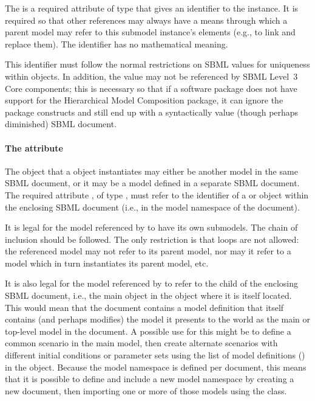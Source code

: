The  is a required attribute of type  that gives
an identifier to the \Submodel instance.  It is required so that other
references may always have a means through which a parent model may
refer to this submodel instance's elements (e.g., to link and replace
them).  The identifier has no mathematical meaning.

This identifier must follow the normal restrictions on SBML
 values for uniqueness within \Model objects.  In
addition, the  value may not be referenced by SBML Level~3
Core components; this is necessary so that if a software package does
not have support for the Hierarchical Model Composition package, it can
ignore the package constructs and still end up with a syntactically
value (though perhaps diminished) SBML document.  


\paragraph{The \hspace*{1pt} attribute}
\label{submodel-modelref}
  
The \Model object that a \Submodel object instantiates may either be
another model in the same SBML document, or it may be a model defined in
a separate SBML document.  The required attribute , of
type , must refer to the identifier of a \Model or
\ExternalModelDefinition object within the enclosing SBML document
(i.e., in the model namespace of the document).  

It is legal for the model referenced by  to have its own submodels.
The chain of inclusion should be followed.  The only restriction is that
loops are not allowed: the referenced model may not refer to its parent
model, nor may it refer to a model which in turn instantiates its parent
model, etc.

It is also legal for the model referenced by  to refer
to the  child of the enclosing SBML document, i.e., the
main \Model object in the \SBML object where it is itself located.  This
would mean that the document contains a model definition that itself
contains (and perhaps modifies) the model it presents to the world as
the main or top-level model in the document.  A possible use for this
might be to define a common scenario in the main model, then create
alternate scenarios with different initial conditions or parameter sets using the list of
model definitions () in the \SBML object.
Because the model namespace is defined per document, this means that it
is possible to define and include a new model namespace by creating a
new document, then importing one or more of those models using the
\ExternalModelDefinition class.


